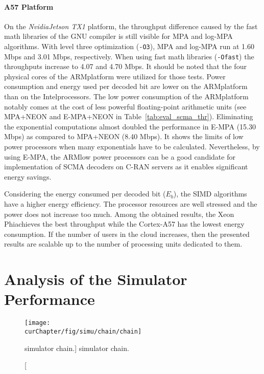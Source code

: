 \paragraph{A57 Platform}

On the \emph{Nvidia\R Jetson TX1} platform, the throughput difference caused by
the fast math libraries of the GNU compiler is still visible for MPA and log-MPA
algorithms. With level three optimization (\verb|-O3|), MPA and log-MPA run at
1.60 Mbps and 3.01 Mbps, respectively. When using fast math libraries
(\verb|-Ofast|) the throughputs increase to 4.07 and 4.70 Mbps. It should be
noted that the four physical cores of the ARM\R platform were  utilized for
those tests. Power consumption and energy used per decoded bit are lower on the
ARM\R platform than on the Intel\R processors. The low power consumption of the
ARM\R platform notably comes at the cost of less powerful floating-point
arithmetic units (see MPA+NEON and E-MPA+NEON in Table~\ref{tab:eval_scma_thr}).
Eliminating the exponential computations almost doubled the performance in E-MPA
(15.30 Mbps) as compared to MPA+NEON (8.40 Mbps). It shows the limits of low
power processors when many exponentials have to be calculated. Nevertheless, by
using E-MPA, the ARM\R low power processors can be a good candidate for
implementation of SCMA decoders on C-RAN servers as it enables significant
energy savings.

Considering the energy consumed per decoded bit ($E_b$), the SIMD algorithms
have a higher energy efficiency. The processor resources are well stressed and
the power does not increase too much. Among the obtained results, the Xeon
Phi\TM achieves the best throughput while the Cortex-A57 has the lowest energy
consumption. If the number of users in the cloud increases, then the presented
results are scalable up to the number of processing units dedicated to them.

\section{Analysis of the Simulator Performance}
\label{sec:eval_simu}

\begin{figure}[htp]
  \centering
  \texttt{[image: \\curChapter/fig/simu/chain/chain]}
  \caption
    [\AFFECT simulator chain.]
    {\AFFECT simulator chain.}
  \label{fig:eval_simu_chain}
\end{figure}

